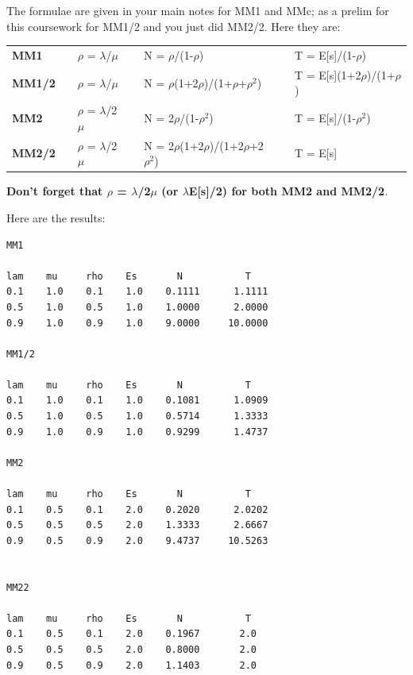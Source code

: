 \begin{enumerate}
The formulae are given in your main notes for MM1 and MMc;
as a prelim for this coursework for MM1/2 and you just did MM2/2.
Here they are:

\begin{center}
\begin{tabular}{lc lc lc l}
{\bf MM1} & & $\rho$ = ${\lambda}$/${\mu}$ &&
          N  = $\rho$/(1-$\rho$)&&
          T =  E[s]/(1-$\rho$)\\[0.1in]

{\bf MM1/2} & & $\rho$ = ${\lambda}$/${\mu}$ &&
          N  = $\rho$(1+2$\rho$)/(1+$\rho$+$\rho^2$)&&
          T =  E[s](1+2$\rho$)/(1+$\rho$)\\[0.1in]

{\bf MM2} & & $\rho$ = ${\lambda}$/2${\mu}$ &&
          N  = 2$\rho$/(1-$\rho^2$)&&
          T =  E[s]/(1-$\rho^2$)\\[0.1in]

{\bf MM2/2} && $\rho$ = $\lambda$/2$\mu$&&
N     =  2$\rho$(1+2$\rho$)/(1+2$\rho$+2$\rho^2$) &&
T     =  E[s] \\[0.1in]
\end{tabular}
\end{center}

{\bf Don't forget that $\rho$ = $\lambda$/2$\mu$ (or $\lambda$E[s]/2)
for both MM2 and MM2/2}. 

Here are the results:


\small
\begin{verbatim}
MM1

lam    mu     rho    Es       N           T
0.1    1.0    0.1    1.0    0.1111      1.1111
0.5    1.0    0.5    1.0    1.0000      2.0000
0.9    1.0    0.9    1.0    9.0000     10.0000

MM1/2

lam    mu     rho    Es       N           T
0.1    1.0    0.1    1.0    0.1081      1.0909
0.5    1.0    0.5    1.0    0.5714      1.3333
0.9    1.0    0.9    1.0    0.9299      1.4737

MM2

lam    mu     rho    Es       N           T
0.1    0.5    0.1    2.0    0.2020      2.0202
0.5    0.5    0.5    2.0    1.3333      2.6667
0.9    0.5    0.9    2.0    9.4737     10.5263


MM22

lam    mu     rho    Es       N           T
0.1    0.5    0.1    2.0    0.1967       2.0
0.5    0.5    0.5    2.0    0.8000       2.0
0.9    0.5    0.9    2.0    1.1403       2.0
\end{verbatim}
\normalsize


\end{enumerate}
